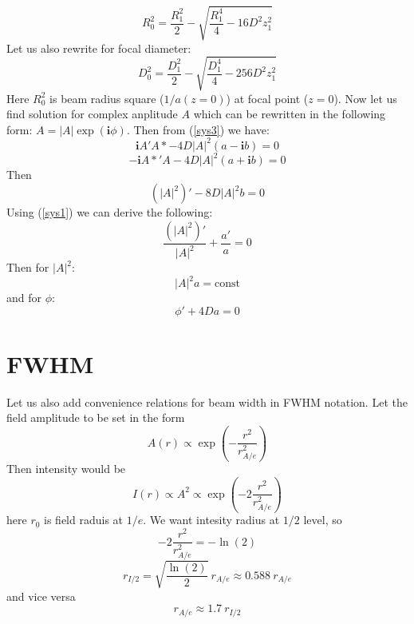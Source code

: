 \documentclass{article}
\newcommand{\ff}{\frac}
\newcommand{\ci}{\mathbf{i}}
\begin{document}
\[ R_0^2 = \ff{R_1^2}{2}-\sqrt{\ff{R_1^4}{4}-16 D^2 z_1^2} \]
Let us also rewrite for focal diameter:
\[ D_0^2 = \ff{D_1^2}{2}-\sqrt{\ff{D_1^4}{4}- 256 D^2 z_1^2} \]
Here $R_0^2$ is beam radius square ($1/a(z=0)$) at focal point ($z=0$).
Now let us find solution for complex anplitude $A$ which can be rewritten in the following form: $A=|A|\exp(\ci \phi)$. Then from (\ref{sys3}) we have:
\[ \ci A' A* - 4D|A|^2(a-\ci b) = 0 \]
\[ -\ci A*' A - 4D|A|^2(a + \ci b) =0 \]
Then
\[ \left(|A|^2\right)' - 8 D |A|^2 b = 0 \]
Using (\ref{sys1}) we can derive the following:
\[ \ff{\left(|A|^2\right)'}{|A|^2}+\ff{a'}{a} = 0 \]
Then for $|A|^2$:
\[ |A|^2 a = \text{const} \]
and for $\phi$:
\[ \phi'+4Da = 0 \]
\section{FWHM}
Let us also add convenience relations for beam width in FWHM notation.
Let the field amplitude to be set in the form
\[ A(r) \propto \exp\left(-\ff{r^2}{r_{A/e}^2}\right) \]
Then intensity would be
\[ I(r) \propto A^2 \propto \exp\left(-2 \ff{r^2}{r_{A/e}^2}\right) \]
here $r_0$ is field raduis at $1/e$. We want intesity radius at $1/2$ level, so
\[ -2 \ff{r^2}{r_{A/e}^2} = -\ln(2) \]
\[ r_{I/2} = \sqrt{\ff{\ln(2)}{2}} \ r_{A/e} \approx 0.588 \ r_{A/e}  \]
and vice versa
\[ r_{A/e} \approx 1.7 \ r_{I/2}  \]
\end{document}
